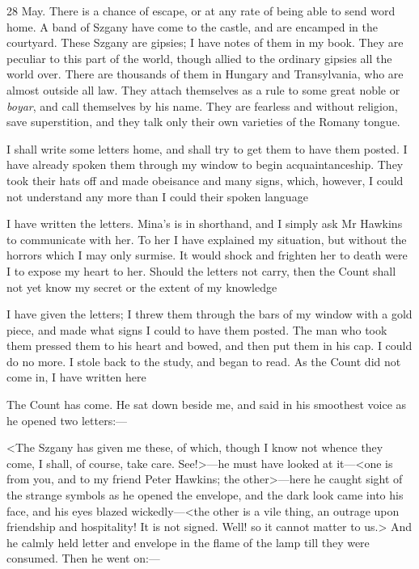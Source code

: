\begin{diary}{28 May.}
There is a chance of escape, or at any rate of being able to send word home. A band of Szgany have come to the castle, and are encamped in the courtyard. These Szgany are gipsies; I have notes of them in my book. They are peculiar to this part of the world, though allied to the ordinary gipsies all the world over. There are thousands of them in Hungary and Transylvania, who are almost outside all law. They attach themselves as a rule to some great noble or \textit{boyar}, and call themselves by his name. They are fearless and without religion, save superstition, and they talk only their own varieties of the Romany tongue.

I shall write some letters home, and shall try to get them to have them posted. I have already spoken them through my window to begin acquaintanceship. They took their hats off and made obeisance and many signs, which, however, I could not understand any more than I could their spoken language

 

I have written the letters. Mina's is in shorthand, and I simply ask Mr Hawkins to communicate with her. To her I have explained my situation, but without the horrors which I may only surmise. It would shock and frighten her to death were I to expose my heart to her. Should the letters not carry, then the Count shall not yet know my secret or the extent of my knowledge

 

I have given the letters; I threw them through the bars of my window with a gold piece, and made what signs I could to have them posted. The man who took them pressed them to his heart and bowed, and then put them in his cap. I could do no more. I stole back to the study, and began to read. As the Count did not come in, I have written here

 

The Count has come. He sat down beside me, and said in his smoothest voice as he opened two letters:—

<The Szgany has given me these, of which, though I know not whence they come, I shall, of course, take care. See!>—he must have looked at it—<one is from you, and to my friend Peter Hawkins; the other>—here he caught sight of the strange symbols as he opened the envelope, and the dark look came into his face, and his eyes blazed wickedly—<the other is a vile thing, an outrage upon friendship and hospitality! It is not signed. Well! so it cannot matter to us.> And he calmly held letter and envelope in the flame of the lamp till they were consumed. Then he went on:—


\end{diary}
